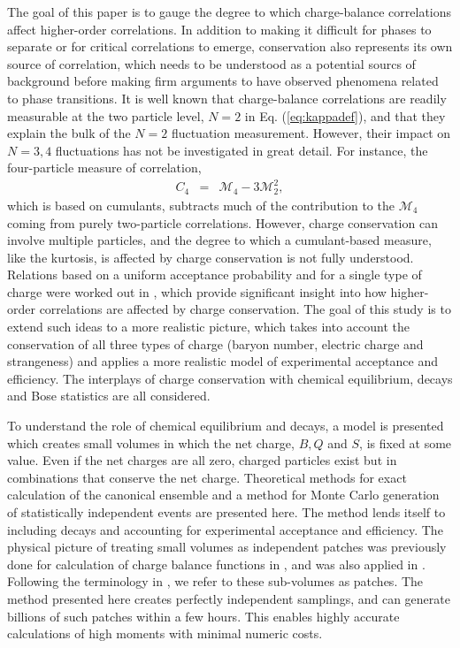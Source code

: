 \documentclass[aps,prc,nofootinbib,showpacs,superscriptaddress,groupedaddress]{revtex4-1}
\begin{document}
The goal of this paper is to gauge the degree to which charge-balance correlations affect higher-order correlations. In addition to making it difficult for phases to separate or for critical correlations to emerge, conservation also represents its own source of correlation, which needs to be understood as a potential sourcs of background before making firm arguments to have observed phenomena related to phase transitions. It is well known that charge-balance correlations are readily measurable at the two particle level, $N=2$ in Eq. (\ref{eq:kappadef}), and that they explain the bulk of the $N=2$ fluctuation measurement. However, their impact on $N=3,4$ fluctuations has not be investigated in great detail. For instance, the four-particle measure of correlation,
\begin{eqnarray}
C_4&=&\mathcal{M}_4-3\mathcal{M}_2^2,
\end{eqnarray}
which is based on cumulants, subtracts much of the contribution to the $\mathcal{M}_4$ coming from purely two-particle correlations. However, charge conservation can involve multiple particles, and the degree to which a cumulant-based measure, like the kurtosis, is affected by charge conservation is not fully understood. Relations based on a uniform acceptance probability and for a single type of charge were worked out in \cite{Savchuk:2019xfg}, which provide significant insight into how higher-order correlations are affected by charge conservation. The goal of this study is to extend such ideas to a more realistic picture, which takes into account the conservation of all three types of charge (baryon number, electric charge and strangeness) and applies a more realistic model of experimental acceptance and efficiency. The interplays of charge conservation with chemical equilibrium, decays and Bose statistics are all considered.

To understand the role of chemical equilibrium and decays, a model is presented which creates small volumes in which the net charge, $B,Q$ and $S$, is fixed at some value. Even if the net charges are all zero, charged particles exist but in combinations that conserve the net charge. Theoretical methods for exact calculation of the canonical ensemble and a method for Monte Carlo generation of statistically independent events are presented here. The method lends itself to including decays and accounting for experimental acceptance and efficiency. The physical picture of treating small volumes as independent patches was previously done for calculation of charge balance functions in \cite{Schlichting:2010qia,Schlichting:2010na}, and was also applied in \cite{Oliinychenko:2020cmr}. Following the terminology in \cite{Oliinychenko:2020cmr}, we refer to these sub-volumes as patches. The method presented here creates perfectly independent samplings, and can generate billions of such patches within a few hours. This enables highly accurate calculations of high moments with minimal numeric costs.
\end{document}
